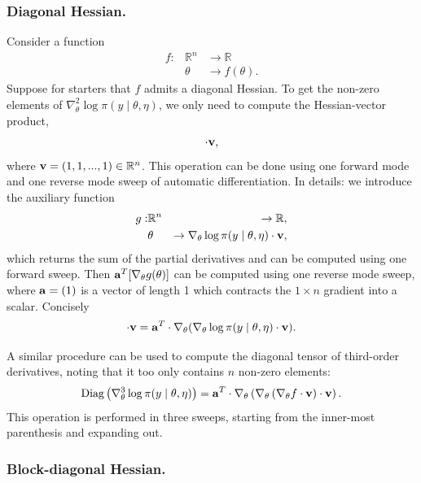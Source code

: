 \documentclass[stslayout, noinfoline]{imsart}
\theoremstyle{definition}
\begin{document}
\subsubsection{Diagonal Hessian.}

Consider a function
\begin{eqnarray*}
  f : & \mathbb R^n & \to \mathbb R\\
      & \theta & \to f(\theta).
\end{eqnarray*}
%
Suppose for starters that $f$ admits a diagonal Hessian.
To get the non-zero elements of $\nabla^2_\theta \log \pi(y \mid \theta, \eta)$, we only need to compute the Hessian-vector product,
\begin{equation*}
  [ \nabla^2_\theta \log \pi(y \mid \theta, \eta) ] \cdot \bf v,
\end{equation*}
where ${\bf v} = (1, 1, ..., 1) \in \mathbb R^n$.
This operation can be done using one forward mode and one reverse mode sweep of automatic differentiation.
In details: we introduce the auxiliary function
\begin{eqnarray*}
  g :& \mathbb R^n & \to \mathbb R, \\
      & \theta & \to \nabla_\theta \log \pi(y \mid \theta, \eta) \cdot {\bf v},
\end{eqnarray*}
which returns the sum of the partial derivatives and can be computed using one forward sweep.
Then ${\bf a}^T [\nabla_\theta g(\theta)]$ can be computed using one reverse mode sweep, where ${\bf a} = (1)$ is a vector of length 1 which contracts the $1 \times n$ gradient into a scalar.
Concisely
\begin{equation}
  [ \nabla^2_\theta \log \pi(y \mid \theta, \eta) ] \cdot {\bf v} = {\bf a}^T \cdot \nabla_\theta (\nabla_\theta \log \pi(y \mid \theta, \eta) \cdot {\bf v}).
\end{equation}

A similar procedure can be used to compute the diagonal tensor of third-order derivatives,
noting that it too only contains $n$ non-zero elements:
\begin{equation}
  \text{Diag} \left (\nabla^3_\theta \log \pi(y \mid \theta, \eta) \right) = {\bf a}^T \cdot \nabla_\theta \left( \nabla_\theta \left (\nabla_\theta f \cdot {\bf v} \right) \cdot {\bf v} \right). 
\end{equation}
%
This operation is performed in three sweeps, starting from the inner-most parenthesis and expanding out.


\subsubsection{Block-diagonal Hessian.}
\end{document}
